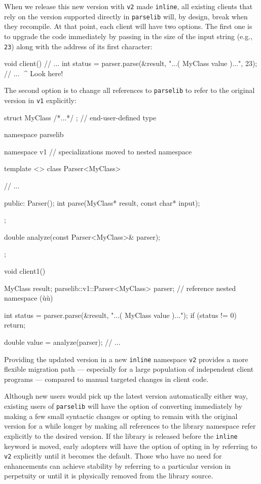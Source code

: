 \noindent When we release this new version with \lstinline!v2! made \lstinline!inline!,
all existing clients that rely on the version supported directly in
\lstinline!parselib! will, by design, break when they recompile. At
that point, each client will have two options. The first one is
to upgrade the code immediately by passing in the size of the input
string (e.g., \lstinline!23!) along with the address of its first
character:

\begin{emcppslisting}[emcppserrorlines={4}]
void client()
{
    // ...
    int status = parser.parse(&result, "...( MyClass value )...", 23);
    // ...                                                      ^^^^ Look here!
}
\end{emcppslisting}
    
\noindent The second option is to change all references to
\lstinline!parselib! to refer to the original version in \lstinline!v1!
explicitly:

\begin{emcppshiddenlisting}[emcppsbatch=e3]
struct MyClass { /*...*/ };  // end-user-defined type
\end{emcppshiddenlisting}
\begin{emcppslisting}[emcppsbatch=e3]
namespace parselib
{
    namespace v1  // specializations moved to nested namespace
    {
        template <>
        class Parser<MyClass>
        {
            // ...

        public:
            Parser();
            int parse(MyClass* result, const char* input);
        };

        double analyze(const Parser<MyClass>& parser);
    }
};

void client1()
{
    MyClass result;
    parselib::v1::Parser<MyClass> parser;  // reference nested namespace (ù{}ù)

    int status = parser.parse(&result, "...( MyClass value )...");
    if (status != 0)
    {
        return;
    }

    double value = analyze(parser);
    // ...
}
\end{emcppslisting}
    
\noindent Providing the updated version in a new \lstinline!inline! namespace
\lstinline!v2! provides a more flexible migration path --- especially for a
large population of independent client programs --- compared to manual
targeted changes in client code.

Although new users would pick up the latest version automatically either
way, existing users of \lstinline!parselib! will have the option of
converting immediately by making a few small syntactic changes or
opting to remain with the original version for a while longer by making
all references to the library namespace refer explicitly to the desired
version. If the library is released before the \lstinline!inline! keyword
is moved, early adopters will have the option of opting in by referring
to \lstinline!v2! explicitly until it becomes the default. Those who have
no need for enhancements can achieve stability by referring to a
particular version in perpetuity or until it is physically removed from
the library source.

